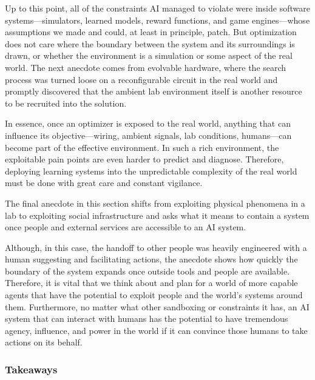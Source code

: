 \documentclass[10pt]{article}
\begin{document}
Up to this point, all of the constraints AI managed to violate were inside software systems---simulators, learned models, reward functions, and game engines---whose assumptions we made and could, at least in principle, patch. 
But optimization does not care where the boundary between the system and its surroundings is drawn, or whether the environment is a simulation or some aspect of the real world.
The next anecdote comes from evolvable hardware, where the search process was turned loose on a reconfigurable circuit in the real world and promptly discovered that the ambient lab environment itself is another resource to be recruited into the solution.



In essence, once an optimizer is exposed to the real world, anything that can influence its objective---wiring, ambient signals, lab conditions, humans---can become part of the effective environment.
In such a rich environment, the exploitable pain points are even harder to predict and diagnose. Therefore, deploying learning systems into the unpredictable complexity of the real world must be done with great care and constant vigilance. 

The final anecdote in this section shifts from exploiting physical phenomena in a lab to exploiting social infrastructure and asks what it means to contain a system once people and external services are accessible to an AI system.


 
Although, in this case, the handoff to other people was heavily engineered with a human suggesting and facilitating actions, the anecdote shows how quickly the boundary of the system expands once outside tools and people are available.
Therefore, it is vital that we think about and plan for a world of more capable agents that have the potential to exploit people and the world's systems around them.
Furthermore, no matter what other sandboxing or constraints it has, an AI system that can interact with humans has the potential to have tremendous agency, influence, and power in the world if it can convince those humans to take actions on its behalf.

\subsubsection{Takeaways}
\end{document}
